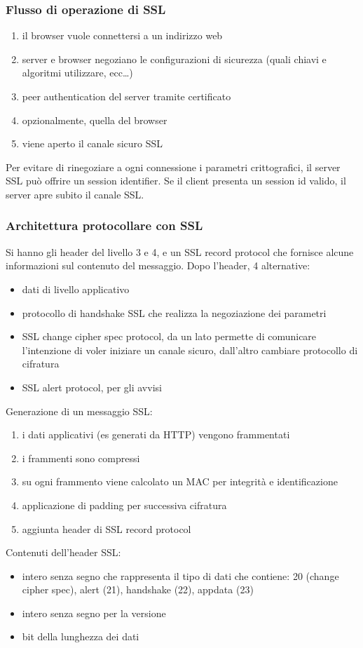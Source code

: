 \documentclass[11pt]{article}
\begin{document}
\subsubsection{Flusso di operazione di SSL}
\begin{enumerate}
    \item il browser vuole connettersi a un indirizzo web 
    \item server e browser negoziano le configurazioni di sicurezza (quali chiavi e algoritmi utilizzare, ecc\dots)
    \item peer authentication del server tramite certificato 
    \item opzionalmente, quella del browser 
    \item viene aperto il canale sicuro SSL  
\end{enumerate}
Per evitare di rinegoziare a ogni connessione i parametri crittografici, il server SSL può offrire un session identifier.
Se il client presenta un session id valido, il server apre subito il canale SSL.
\subsubsection{Architettura protocollare con SSL}
Si hanno gli header del livello 3 e 4, e un SSL record protocol che fornisce alcune informazioni sul contenuto del messaggio.
Dopo l'header, 4 alternative:
\begin{itemize}
    \item dati di livello applicativo 
    \item protocollo di handshake SSL che realizza la negoziazione dei parametri 
    \item SSL change cipher spec protocol, da un lato permette di comunicare l'intenzione di voler iniziare un canale 
    sicuro, dall'altro cambiare protocollo di cifratura 
    \item SSL alert protocol, per gli avvisi 
\end{itemize}
Generazione di un messaggio SSL:
\begin{enumerate}
    \item i dati applicativi (es generati da HTTP) vengono frammentati 
    \item i frammenti sono compressi 
    \item su ogni frammento viene calcolato un MAC per integrità e identificazione 
    \item applicazione di padding per successiva cifratura 
    \item aggiunta header di SSL record protocol 
\end{enumerate}
Contenuti dell'header SSL:
\begin{itemize}
    \item intero senza segno che rappresenta il tipo di dati che contiene: 20 (change cipher spec), alert (21), handshake (22), appdata (23)
    \item intero senza segno per la versione 
    \item bit della lunghezza dei dati 
\end{itemize}
\end{document}
